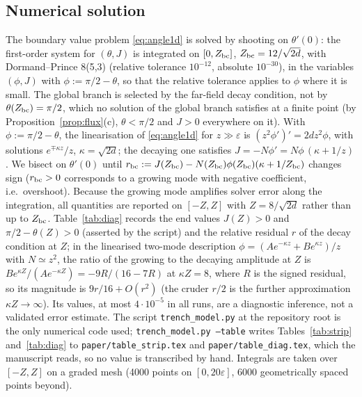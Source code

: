 \documentclass[11pt,a4paper]{article}
\theoremstyle{plain}
\theoremstyle{definition}
\theoremstyle{remark}
\begin{document}
\subsection{Numerical solution}
The boundary value problem \eqref{eq:angle1d} is solved by shooting on $\theta'(0)$: the first-order system for $(\theta,J)$ is integrated on $[0,Z_{\rm bc}]$, $Z_{\rm bc}=12/\sqrt{2d}$, with Dormand--Prince 8(5,3) (relative tolerance $10^{-12}$, absolute $10^{-30}$), in the variables $(\phi,J)$ with $\phi:=\pi/2-\theta$, so that the relative tolerance applies to $\phi$ where it is small. The global branch is selected by the far-field decay condition, not by $\theta(Z_{\rm bc})=\pi/2$, which no solution of the global branch satisfies at a finite point (by Proposition~\ref{prop:flux}(c), $\theta<\pi/2$ and $J>0$ everywhere on it). With $\phi:=\pi/2-\theta$, the linearisation of \eqref{eq:angle1d} for $z\gg\varepsilon$ is $(z^2\phi')'=2dz^2\phi$, with solutions $e^{\mp\kappa z}/z$, $\kappa=\sqrt{2d}$; the decaying one satisfies $J=-N\phi'=N\phi\,(\kappa+1/z)$. We bisect on $\theta'(0)$ until $r_{\rm bc}:=J(Z_{\rm bc})-N(Z_{\rm bc})\phi(Z_{\rm bc})(\kappa+1/Z_{\rm bc})$ changes sign ($r_{\rm bc}>0$ corresponds to a growing mode with negative coefficient, i.e.\ overshoot). Because the growing mode amplifies solver error along the integration, all quantities are reported on $[-Z,Z]$ with $Z=8/\sqrt{2d}$ rather than up to $Z_{\rm bc}$. Table~\ref{tab:diag} records the end values $J(Z)>0$ and $\pi/2-\theta(Z)>0$ (asserted by the script) and the relative residual $r$ of the decay condition at $Z$; in the linearised two-mode description $\phi=(Ae^{-\kappa z}+Be^{\kappa z})/z$ with $N\simeq z^2$, the ratio of the growing to the decaying amplitude at $Z$ is $Be^{\kappa Z}/(Ae^{-\kappa Z})=-9R/(16-7R)$ at $\kappa Z=8$, where $R$ is the signed residual, so its magnitude is $9r/16+O(r^2)$ (the cruder $r/2$ is the further approximation $\kappa Z\to\infty$). Its values, at most $4\cdot10^{-5}$ in all runs, are a diagnostic inference, not a validated error estimate. The script \texttt{trench\_model.py} at the repository root is the only numerical code used; \texttt{trench\_model.py --table} writes Tables~\ref{tab:strip} and~\ref{tab:diag} to \texttt{paper/table\_strip.tex} and \texttt{paper/table\_diag.tex}, which the manuscript reads, so no value is transcribed by hand. Integrals are taken over $[-Z,Z]$ on a graded mesh (4000 points on $[0,20\varepsilon]$, 6000 geometrically spaced points beyond).
\end{document}
